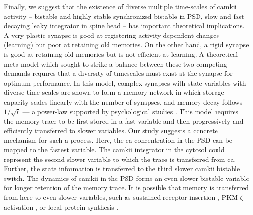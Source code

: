 \documentclass[9pt,lineno,doublespacing]{elife}
\begin{document}
Finally, we suggest that the existence of diverse multiple time-scales of
\gls{camkii} activity -- bistable and highly stable synchronized bistable in
PSD, slow and fast decaying leaky integrator in spine head -- has important
theoretical implications. A very plastic synapse is good at registering activity
dependent changes (learning) but poor at retaining old memories. On the other
hand, a rigid synapse is good at retaining old memories but is not efficient at
learning. A theoretical meta-model which sought to strike a balance between
these two competing demands requires that a diversity of timescales must exist
at the synapse \citep{benna_computational_2016} for optimum performance.  In
this model, complex synapses with state variables with diverse time-scales are
shown to form a memory network in which storage capacity scales linearly with
the number of synapses, and memory decay follows \(1/\sqrt{t}\) --- a power-law
supported by psychological studies \citep{wixted_form_1991}. This model requires
the memory trace to be first stored in a fast variable and then progressively
and efficiently transferred to slower variables.  Our study suggests a concrete
mechanism for such a process. Here, the \gls{ca} concentration in the PSD can be
mapped to the fastest variable. The \gls{camkii} integrator in the cytosol could
represent the second slower variable to which the trace is transferred from
\gls{ca}.  Further, the state information is transferred to the third slower
\gls{camkii} bistable switch. The dynamics of \gls{camkii} in the PSD forms an
even slower bistable variable for longer retention of the memory trace. It is
possible that memory is transferred from here to even slower variables, such as
sustained receptor insertion \citep{hayer_molecular_2005}, PKM-$\zeta$
activation \citep{sacktor_memory_2012}, or local protein synthesis
\citep{aslam_translational_2009}.

\end{document}
